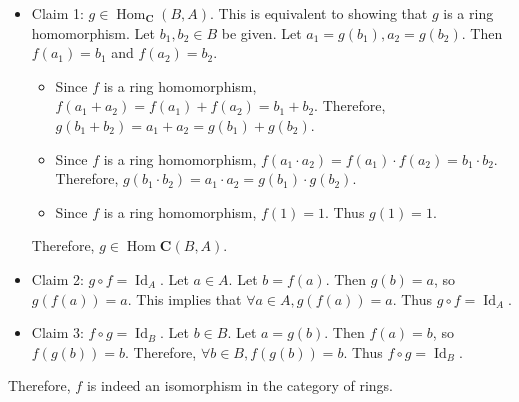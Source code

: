 \documentclass[12pt, psamsfonts]{amsart}
\theoremstyle{definition}
\theoremstyle{remark}
\DeclareMathOperator{\Hom}{Hom}
\DeclareMathOperator{\Id}{Id}
\numberwithin{equation}{section}
\begin{document}
\begin{itemize}
  \item
    Claim 1: $g \in \Hom_{\mathbf{C}}(B, A)$.
    This is equivalent to showing that $g$ is a ring homomorphism.
    Let $b_1, b_2 \in B$ be given.
    Let $a_1 = g(b_1), a_2 = g(b_2)$.
    Then $f(a_1) = b_1$ and $f(a_2) = b_2$.
    \begin{itemize}
      \item
        Since $f$ is a ring homomorphism, $f(a_1 + a_2) = f(a_1) + f(a_2) = b_1 + b_2$.
        Therefore, $g(b_1 + b_2) = a_1 + a_2 = g(b_1) + g(b_2)$.
      \item
        Since $f$ is a ring homomorphism, $f(a_1 \cdot a_2) = f(a_1) \cdot f(a_2) = b_1 \cdot b_2$.
        Therefore, $g(b_1 \cdot b_2) = a_1 \cdot a_2 = g(b_1) \cdot g(b_2)$.
      \item
        Since $f$ is a ring homomorphism, $f(1) = 1$.
        Thus $g(1) = 1$.
    \end{itemize}
    Therefore, $g \in \Hom{\mathbf{C}}(B, A)$.
  \item
    Claim 2: $ g \circ f = \Id_A$.
    Let $a \in A$.
    Let $b = f(a)$.
    Then $g(b) = a$, so $g(f(a)) = a$.
    This implies that $\forall a \in A, g(f(a)) = a$.
    Thus $g \circ f = \Id_A$.
  \item
    Claim 3: $ f \circ g = \Id_B$.
    Let $b \in B$.
    Let $a = g(b)$.
    Then $f(a) = b$, so $f(g(b)) = b$.
    Therefore, $\forall b \in B, f(g(b)) = b$.
    Thus $f \circ g = \Id_B$.
\end{itemize}

Therefore, $f$ is indeed an isomorphism in the category of rings.
\end{document}
